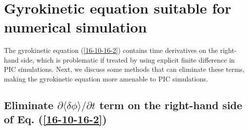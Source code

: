 \documentclass{llncs}
\begin{document}
\

\section{Gyrokinetic equation suitable for numerical simulation}

The gyrokinetic equation (\ref{16-10-16-2}) contains time derivatives on the
right-hand side, which is problematic if treated by using explicit finite
difference in PIC simulations. Next, we discuss some methods that can
eliminate these terms, making the gyrokinetic equation more amenable to PIC
simulations.

\subsection{Eliminate $\partial \langle \delta \phi \rangle / \partial t$ term
on the right-hand side of Eq. (\ref{16-10-16-2})}
\end{document}
